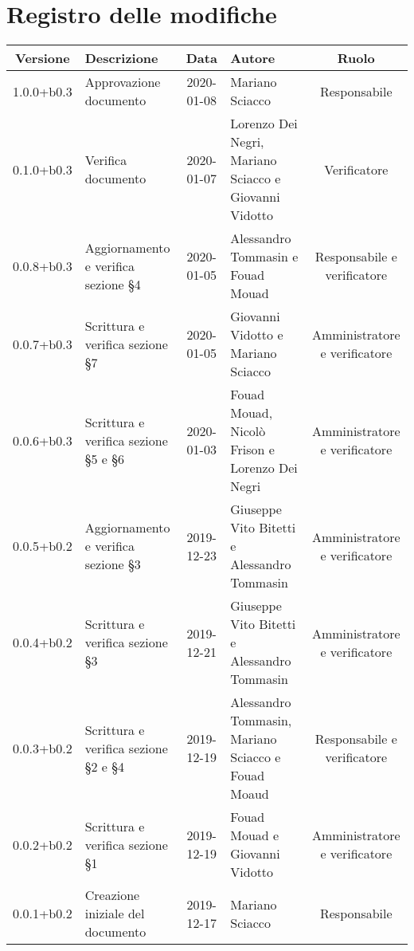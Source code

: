 \section*{Registro delle modifiche}

\begin{center}
	\begin{longtable}{|c|p{3cm}|c|p{4cm}|c|}
	\hline
	\rowcolor{lighter-grayer}
	\textbf{Versione} & \textbf{Descrizione} & \textbf{Data} & \textbf{Autore} & \textbf{Ruolo} \\
	\hline
	\endfirsthead

	1.0.0+b0.3 & Approvazione documento & 2020-01-08 & Mariano Sciacco & Responsabile \\
	\hline 
	0.1.0+b0.3 & Verifica documento & 2020-01-07 & Lorenzo Dei Negri,  Mariano Sciacco e Giovanni Vidotto & Verificatore \\
	\hline
	0.0.8+b0.3 & Aggiornamento e verifica sezione \S4  & 2020-01-05 & Alessandro Tommasin e Fouad Mouad & Responsabile e verificatore \\
	\hline  
	0.0.7+b0.3 & Scrittura e verifica sezione \S7  & 2020-01-05 & Giovanni Vidotto e Mariano Sciacco & Amministratore e verificatore \\
	\hline 
	0.0.6+b0.3 & Scrittura e verifica sezione \S5 e \S6  & 2020-01-03 & Fouad Mouad, Nicolò Frison e Lorenzo Dei Negri & Amministratore e verificatore \\
	\hline 
	0.0.5+b0.2 & Aggiornamento e verifica sezione \S3 & 2019-12-23 & Giuseppe Vito Bitetti e Alessandro Tommasin & Amministratore e verificatore \\
	\hline
	0.0.4+b0.2 & Scrittura e verifica sezione \S3 & 2019-12-21 & Giuseppe Vito Bitetti e Alessandro Tommasin & Amministratore e verificatore \\
	\hline 
	0.0.3+b0.2 & Scrittura e verifica sezione \S2 e \S4 & 2019-12-19 & Alessandro Tommasin, Mariano Sciacco e Fouad Moaud & Responsabile e verificatore \\
	\hline 
	0.0.2+b0.2 & Scrittura e verifica sezione \S1 & 2019-12-19 & Fouad Mouad e Giovanni Vidotto & Amministratore e verificatore \\
	\hline 
	0.0.1+b0.2 & Creazione iniziale del documento & 2019-12-17 & Mariano Sciacco & Responsabile \\
	\hline
	

	\end{longtable}
\end{center}